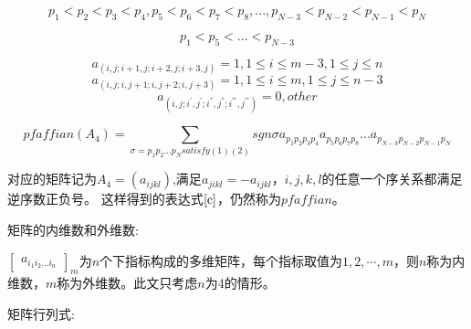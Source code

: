\documentclass{amsc}          %
\numberwithin{equation}{section} %
\begin{document}
    \begin{equation}\label{a}p_{1}<p_{2}<p_{3}<p_{4},p_{5}<p_{6}<p_{7}<p_{8}
   ,...,p_{N-3}<p_{N-2}<p_{N-1}<p_{N}\end{equation}

   \begin{equation}\label{b}p_{1}<p_{5}<...<p_{N-3}\end{equation}

   \begin{equation}a_{(i,j;i+1,j;i+2,j;i+3,j)}=1,1\leq i \leq m-3,1\leq j\leq n\end{equation}
   \begin{equation}a_{(i,j;i,j+1;i,j+2;i,j+3)}=1,1\leq i \leq m,1\leq j\leq n-3\end{equation}
   \begin{equation}a_{(i,j;i^{'},j^{'};i^{''},j^{''};i^{'''},j^{'''})}=0,other \end{equation}

   \begin{equation}\label{c}pfaffian(A_{4})=\sum\limits_{\sigma=p_{1}p_{2}...p_{N}satisfy(1)(2)}sgn\sigma a_{p_{1}p_{2}p_{3}p_{4}}a_{p_{5}p_{6}p_{7}p_{8}}...a_{p_{N-3}p_{N-2}p_{N-1}p_{N}}\end{equation}

   对应的矩阵记为$A_{4}=(a_{ijkl})$,满足$a_{jikl}=-a_{ijkl}$，$i,j,k,l$的任意一个序关系都满足逆序数正负号。
   这样得到的表达式$\ref{c}$，仍然称为$pfaffian$。



\begin{definition} 矩阵的内维数和外维数:

$\begin{bmatrix}
a_{i_{1}i_{2}...i_{n}}\end{bmatrix}_{m}$为$n$个下指标构成的多维矩阵，每个指标取值为$1,2,\cdots,m$，则$n$称为内维数，$m$称为外维数。此文只考虑$n$为4的情形。
\end{definition}

\begin{definition} 矩阵行列式:
\end{definition}
\end{document}
